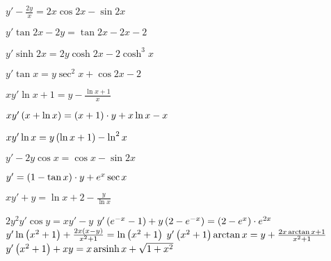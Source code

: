 	\begin{multicols}{2}
		\begin{enumtasks}

			\item \( y' - \frac{2y}{x} = 2x \cos{2x} - \sin{2x} \) 											%
			\item \( y' \tan{2x} - 2y = \tan{2x} - 2x - 2 \) 												%
			\item \( y' \sinh{2x} = 2y \cosh{2x} - 2\cosh^3{x} \) 											%
			\item \( y' \tan{x} = y \sec^2{x} + \cos{2x} - 2 \) 											%
			\item \( xy' \ln{x} + 1 = y - \frac{\ln{x} + 1}{x} \) 											%
			\item \( xy' \left( x + \ln{x} \right) = \left( x + 1 \right) \cdot y + x \ln{x} - x \) 						%
			\item \( xy' \ln{x} = y \left( \ln{x} + 1 \right) - \ln^2{x} \) 										%
			\item \( y' - 2y \cos{x} = \cos{x} - \sin{2x} \) 												%
			\item \( y' = \left( 1 - \tan{x} \right) \cdot y + e^{x} \sec{x} \) 									%
			\item \( xy' + y = \ln{x} + 2 - \frac{y}{\ln{x}} \) 											%
			\item \( 2y^2 y' \cos{y} = xy' - y \) 															%
			\itemstar \( y' \left( e^{-x} - 1 \right) + y \left( 2 - e^{-x} \right) = \left( 2 - e^{x} \right) \cdot e^{2x} \) 	%
			\itemstar \( y' \ln\left( x^2 + 1 \right) + \frac{2x \left( x - y \right)}{x^2 + 1} = \ln\left( x^2 + 1 \right) \) 	%
			\itemstar \( y' \left( x^2 + 1 \right) \arctan{x} = y + \frac{2x \arctan{x} + 1}{x^2 + 1} \) 			%
			\itemstar \( y' \left( x^2 + 1 \right) + xy = x \operatorname{arsinh}{x} + \sqrt{1 + x^2} \) 						%

		\end{enumtasks}
	\end{multicols}

